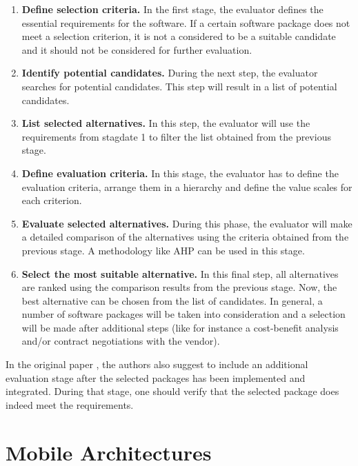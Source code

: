 \begin{enumerate}
    \item \textbf{Define selection criteria.} In the first stage, the evaluator defines the essential requirements for the software. If a certain software package does not meet a selection criterion, it is not a considered to be a suitable candidate and it should not be considered for further evaluation. 
    \item \textbf{Identify potential candidates.} During the next step, the evaluator searches for potential candidates. This step will result in a list of potential candidates.
    \item \textbf{List selected alternatives.} In this step, the evaluator will use the requirements from stagdate 1 to filter the list obtained from the previous stage. 
    \item \textbf{Define evaluation criteria.} In this stage, the evaluator has to define the evaluation criteria, arrange them in a hierarchy and define the value scales for each criterion. 
    \item \textbf{Evaluate selected alternatives.} During this phase, the evaluator will make a detailed comparison of the alternatives using the criteria obtained from the previous stage. A methodology like AHP can be used in this stage.
    \item \textbf{Select the most suitable alternative.} In this final step, all alternatives are ranked using the comparison results from the previous stage. Now, the best alternative can be chosen from the list of candidates. In general, a number of software packages will be taken into consideration and a selection will be made after additional steps (like for instance a cost-benefit analysis and/or contract negotiations with the vendor). 
\end{enumerate}

In the original paper \cite{Jadhav:2009}, the authors also suggest to include an additional evaluation stage after the selected packages has been implemented and integrated. During that stage, one should verify that the selected package does indeed meet the requirements.

\section{Mobile Architectures}



